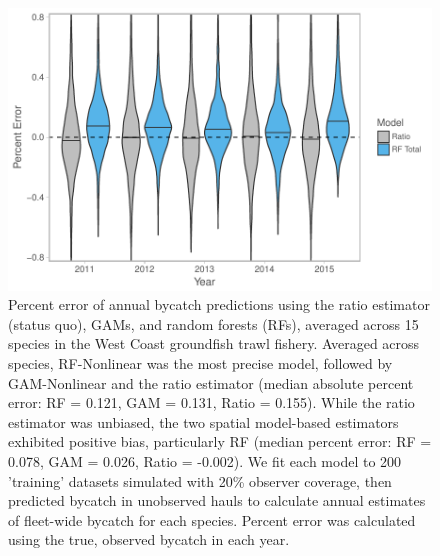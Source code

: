 \documentclass[]{article}
\begin{document}
\begin{figure}

{\centering \includegraphics[width=6in]{bycatch_sim_paper_sepsupp_files/figure-latex/model-comparison-byyear-1} 

}

\caption{Percent error of annual bycatch predictions using the ratio estimator (status quo), GAMs, and random forests (RFs), averaged across 15 species in the West Coast groundfish trawl fishery. Averaged across species, RF-Nonlinear was the most precise model, followed by GAM-Nonlinear and the ratio estimator (median absolute percent error: RF = 0.121, GAM = 0.131, Ratio = 0.155). While the ratio estimator was unbiased, the two spatial model-based estimators exhibited positive bias, particularly RF (median percent error: RF = 0.078, GAM = 0.026, Ratio = -0.002). We fit each model to 200 'training' datasets simulated with 20\% observer coverage, then predicted bycatch in unobserved hauls to calculate annual estimates of fleet-wide bycatch for each species. Percent error was calculated using the true, observed bycatch in each year.}\label{fig:model-comparison-byyear}
\end{figure}

\pagebreak
\end{document}
